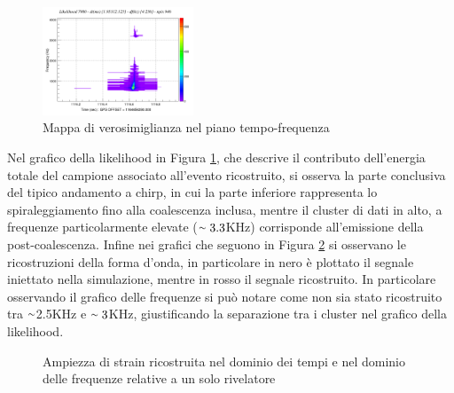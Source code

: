 \begin{figure}
	\vspace{-15pt}
	\begin{center}
		\includegraphics[width=0.4\textwidth]{figures/Capitolo_3/APR4_q09/l_tfmap_scalogram.png}
	\end{center}
	\vspace{-10pt}
	\caption{Mappa di verosimiglianza nel piano tempo-frequenza}
	\label{fig:Likelihood_APR4}
	\vspace{-15pt}
\end{figure}
Nel grafico della likelihood in Figura \ref{fig:Likelihood_APR4}, che descrive il contributo dell'energia totale del campione associato all'evento ricostruito, si osserva la parte conclusiva del tipico andamento a chirp, in cui la parte inferiore rappresenta lo spiraleggiamento fino alla coalescenza inclusa, mentre il cluster di dati in alto, a frequenze particolarmente elevate ($\smallsim 3.3$KHz) corrisponde all'emissione della post-coalescenza.
Infine nei grafici che seguono in Figura \ref{fig:strain_apr4} si osservano le ricostruzioni della forma d'onda, in particolare in nero è plottato il segnale iniettato nella simulazione, mentre in rosso il segnale ricostruito. In particolare osservando il grafico delle frequenze si può notare come non sia stato ricostruito tra $\smallsim$2.5KHz e $\smallsim3$KHz, giustificando la separazione tra i cluster nel grafico della likelihood.
\begin{figure}[H]
	\vspace{-10pt}
	\centering
	 \quad\quad
	\vspace{-5pt}
	\caption{Ampiezza di strain ricostruita nel dominio dei tempi e nel dominio delle frequenze relative a un solo rivelatore}
	\label{fig:strain_apr4}
	\vspace{-15pt}
\end{figure}
